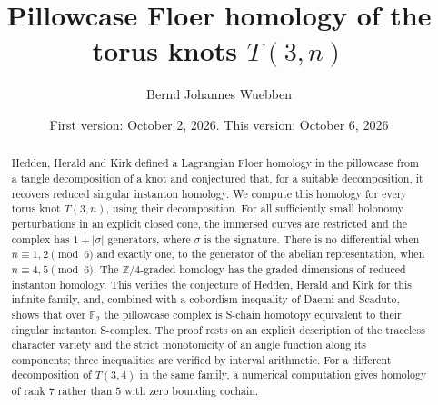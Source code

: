 \documentclass[11pt,reqno]{amsart}
\theoremstyle{plain}
\theoremstyle{definition}
\numberwithin{equation}{section}
\begin{document}
\title{Pillowcase Floer homology of the torus knots $T(3,n)$}

\author{Bernd Johannes Wuebben}
\date{First version: October 2, 2026. This version: October 6, 2026}

\begin{abstract}
Hedden, Herald and Kirk defined a Lagrangian Floer homology in the pillowcase from a tangle decomposition of
a knot and conjectured that, for a suitable decomposition, it recovers reduced singular instanton homology.
We compute this homology for every torus knot $T(3,n)$, using their decomposition. For all sufficiently small
holonomy perturbations in an explicit closed cone, the immersed curves are restricted and the complex has
$1+|\sigma|$ generators, where $\sigma$ is the signature. There is no differential when $n\equiv1,2\pmod 6$ and
exactly one, to the generator of the abelian representation, when $n\equiv4,5\pmod 6$. The $\mathbb Z/4$-graded
homology has the graded dimensions of reduced instanton homology. This verifies the conjecture of Hedden,
Herald and Kirk for this infinite family, and, combined with a cobordism inequality of Daemi and Scaduto, shows that over $\mathbb F_2$ the
pillowcase complex is S-chain homotopy equivalent to their singular instanton S-complex. The proof rests on an explicit description of the
traceless character variety and the strict monotonicity of an angle function along its components; three
inequalities are verified by interval arithmetic. For a different decomposition of $T(3,4)$ in the same family, a numerical computation gives
homology of rank $7$ rather than $5$ with zero bounding cochain.
\end{abstract}

\maketitle








\appendix

\end{document}
